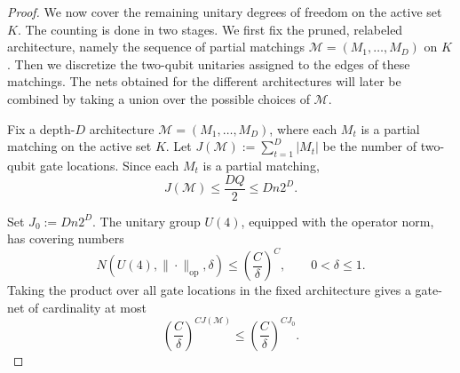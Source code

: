 \documentclass[12pt]{article}
\begin{document}
\begin{proof}
We now cover the remaining unitary degrees of freedom on the active set \(K\). The counting is done in two stages. We first fix the pruned, relabeled architecture, namely the sequence of partial matchings \(\mathcal M=(M_1,\dots,M_D)\) on \(K\). Then we discretize the two-qubit unitaries assigned to the edges of these matchings. The nets obtained for the different architectures will later be combined by taking a union over the possible choices of \(\mathcal M\).

Fix a depth-\(D\) architecture $\mathcal M=(M_1,\dots,M_D)$, where each \(M_t\) is a partial matching on the active set $K.$ Let $J(\mathcal M):=\sum_{t=1}^D |M_t|$ be the number of two-qubit gate locations. Since each \(M_t\) is a partial
matching, 
\[J(\mathcal M)\le \frac{DQ}{2}\le Dn2^D.\]

Set $J_0:=Dn2^D.$ The unitary group \(U(4)\), equipped with the operator norm, has covering numbers
\[
    N(U(4),\|\cdot\|_{\mathrm{op}},\delta)
    \le
    \left(\frac{C}{\delta}\right)^C,
    \qquad 0<\delta\le1.
\]
Taking the product over all gate locations in the fixed architecture gives a
gate-net of cardinality at most
\[
    \left(\frac{C}{\delta}\right)^{C J(\mathcal M)}
    \le
    \left(\frac{C}{\delta}\right)^{C J_0}.
\]


\end{proof}
\end{document}
